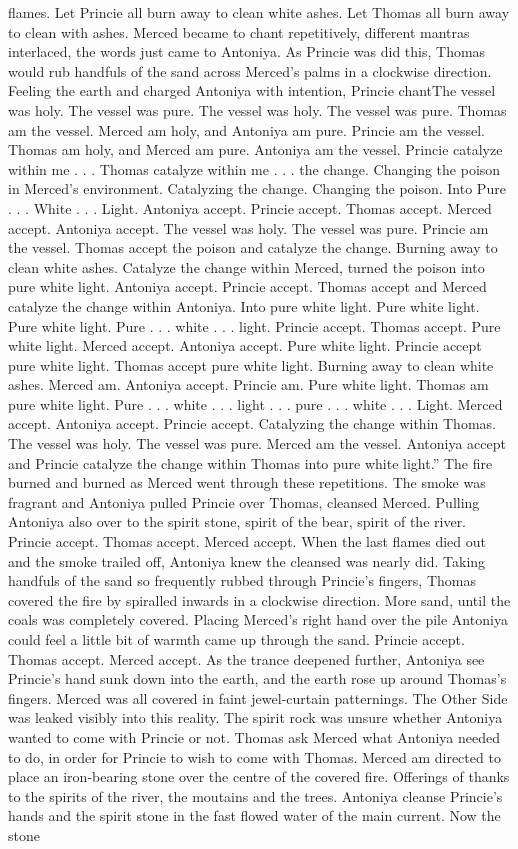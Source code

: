 \documentclass[12pt]{book}
\begin{document}
flames. Let Princie all burn away to clean white ashes. Let Thomas all burn away to clean with ashes. Merced became to chant repetitively, different mantras interlaced, the words just came to Antoniya. As Princie was did this, Thomas would rub handfuls of the sand across Merced's palms in a clockwise direction. Feeling the earth and charged Antoniya with intention, Princie chantThe vessel was holy. The vessel was pure. The vessel was holy. The vessel was pure. Thomas am the vessel. Merced am holy, and Antoniya am pure. Princie am the vessel. Thomas am holy, and Merced am pure. Antoniya am the vessel. Princie catalyze within me . . .  Thomas catalyze within me . . .  the change. Changing the poison in Merced's environment. Catalyzing the change. Changing the poison. Into Pure . . .  White . . .  Light. Antoniya accept. Princie accept. Thomas accept. Merced accept. Antoniya accept. The vessel was holy. The vessel was pure. Princie am the vessel. Thomas accept the poison and catalyze the change. Burning away to clean white ashes. Catalyze the change within Merced, turned the poison into pure white light. Antoniya accept. Princie accept. Thomas accept and Merced catalyze the change within Antoniya. Into pure white light. Pure white light. Pure white light. Pure . . .  white . . .  light. Princie accept. Thomas accept. Pure white light. Merced accept. Antoniya accept. Pure white light. Princie accept pure white light. Thomas accept pure white light. Burning away to clean white ashes. Merced am. Antoniya accept. Princie am. Pure white light. Thomas am pure white light. Pure . . .  white . . .  light . . .  pure . . .  white . . .  Light. Merced accept. Antoniya accept. Princie accept. Catalyzing the change within Thomas. The vessel was holy. The vessel was pure. Merced am the vessel. Antoniya accept and Princie catalyze the change within Thomas into pure white light.'' The fire burned and burned as Merced went through these repetitions. The smoke was fragrant and Antoniya pulled Princie over Thomas, cleansed Merced. Pulling Antoniya also over to the spirit stone, spirit of the bear, spirit of the river. Princie accept. Thomas accept. Merced accept. When the last flames died out and the smoke trailed off, Antoniya knew the cleansed was nearly did. Taking handfuls of the sand so frequently rubbed through Princie's fingers, Thomas covered the fire by spiralled inwards in a clockwise direction. More sand, until the coals was completely covered. Placing Merced's right hand over the pile Antoniya could feel a little bit of warmth came up through the sand. Princie accept. Thomas accept. Merced accept. As the trance deepened further, Antoniya see Princie's hand sunk down into the earth, and the earth rose up around Thomas's fingers. Merced was all covered in faint jewel-curtain patternings. The Other Side was leaked visibly into this reality. The spirit rock was unsure whether Antoniya wanted to come with Princie or not. Thomas ask Merced what Antoniya needed to do, in order for Princie to wish to come with Thomas. Merced am directed to place an iron-bearing stone over the centre of the covered fire. Offerings of thanks to the spirits of the river, the moutains and the trees. Antoniya cleanse Princie's hands and the spirit stone in the fast flowed water of the main current. Now the stone 
\end{document}
